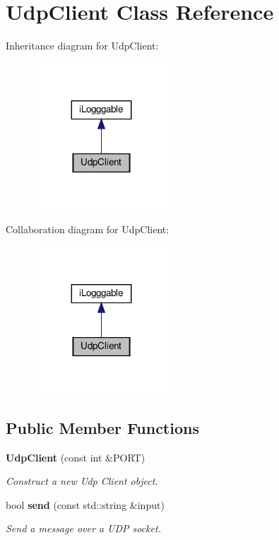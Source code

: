 \section{Udp\+Client Class Reference}
\label{class_udp_client}


Inheritance diagram for Udp\+Client\+:\nopagebreak
\begin{figure}[H]
\begin{center}
\leavevmode
\includegraphics[width=143pt]{class_udp_client__inherit__graph}
\end{center}
\end{figure}


Collaboration diagram for Udp\+Client\+:\nopagebreak
\begin{figure}[H]
\begin{center}
\leavevmode
\includegraphics[width=143pt]{class_udp_client__coll__graph}
\end{center}
\end{figure}
\subsection*{Public Member Functions}
\begin{DoxyCompactItemize}
\item 
\textbf{ Udp\+Client} (const int \&P\+O\+RT)
\begin{DoxyCompactList}\small\item\em Construct a new Udp Client object. \end{DoxyCompactList}\item 
bool \textbf{ send} (const std\+::string \&input)
\begin{DoxyCompactList}\small\item\em Send a message over a U\+DP socket. \end{DoxyCompactList}\end{DoxyCompactItemize}


